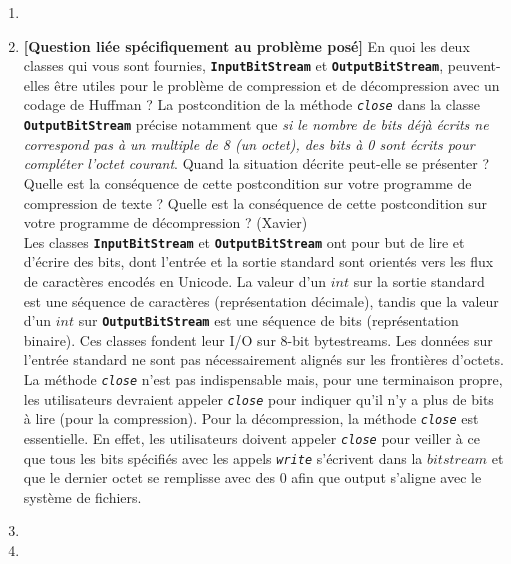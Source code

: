 \documentclass[11pt]{article}
\begin{document}
\begin{enumerate}
\item

\item \textbf{[Question liée spécifiquement au problème posé]} En quoi les deux classes qui
vous sont fournies, \texttt{\textbf{InputBitStream}} et \texttt{\textbf{OutputBitStream}}, peuvent-elles
être utiles pour le problème de compression et de décompression avec un codage
de Huffman ? La postcondition de la méthode \texttt{\textit{close}} dans la classe \texttt{\textbf{OutputBitStream}}
précise notamment que \textit{si le nombre de bits déjà écrits ne correspond pas à un
multiple de 8 (un octet), des bits à 0 sont écrits pour compléter l’octet courant}.
Quand la situation décrite peut-elle se présenter ? Quelle est la conséquence de
cette postcondition sur votre programme de compression de texte ? Quelle est la
conséquence de cette postcondition sur votre programme de décompression ? (Xavier)\\

Les classes \texttt{\textbf{InputBitStream}} et \texttt{\textbf{OutputBitStream}} ont pour but de lire et d'écrire des bits, dont l'entrée et la sortie standard sont orientés vers les flux de caractères encodés en Unicode. La valeur d'un $int$ sur la sortie standard est une séquence de caractères (représentation décimale), tandis que la valeur d'un $int$ sur \texttt{\textbf{OutputBitStream}} est une séquence de bits (représentation binaire). Ces classes  fondent leur I/O sur 8-bit bytestreams. Les données sur l'entrée standard ne sont pas nécessairement alignés sur les frontières d'octets. La méthode \texttt{\textit{close}} n'est pas indispensable mais, pour une terminaison propre, les utilisateurs devraient appeler \texttt{\textit{close}} pour indiquer qu'il n'y a plus de bits à lire (pour la compression). Pour la décompression, la méthode \texttt{\textit{close}} est essentielle. En effet, les utilisateurs doivent appeler \texttt{\textit{close}} pour veiller à ce que tous les bits spécifiés avec les appels \texttt{\textit{write}} s'écrivent dans la $bitstream$ et que le dernier octet se remplisse avec des 0 afin que output s'aligne avec le système de fichiers.\\

\item
\item

\end{enumerate}
\end{document}

